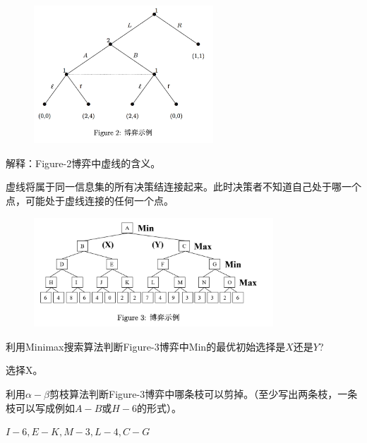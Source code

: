\begin{figure}[htbp]
	\centering\label{fig:2}
	\includegraphics[width=0.6\textwidth]{./figure/fig2.png}
\end{figure}

\begin{problem}
	解释：Figure-2博弈中虚线的含义。
\end{problem}
\begin{solution}
	虚线将属于同一信息集的所有决策结连接起来。此时决策者不知道自己处于哪一个点，可能处于虚线连接的任何一个点。
\end{solution}

\begin{figure}[htbp]
	\centering\label{fig:3}
	\includegraphics[width=0.8\textwidth]{./figure/fig3.png}
\end{figure}

\begin{problem}
	利用Minimax搜索算法判断Figure-3博弈中Min的最优初始选择是$X$还是$Y$?
\end{problem}
\begin{solution}
	选择X。
\end{solution}



\begin{problem}
	利用$\alpha-\beta$剪枝算法判断Figure-3博弈中哪条枝可以剪掉。（至少写出两条枝，一条枝可以写成例如$A-B$或$H-6$的形式）。
\end{problem}
\begin{solution}
	$I-6, E-K, M-3, L-4, C-G$
\end{solution}


